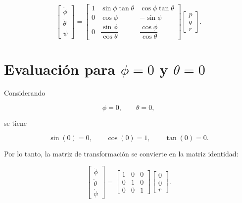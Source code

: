 \documentclass[11pt,a4paper]{article}
\begin{document}
\begin{equation}
\begin{bmatrix}
\dot{\phi}\\
\dot{\theta}\\
\dot{\psi}
\end{bmatrix}
=
\begin{bmatrix}
1 &
\sin\phi\tan\theta &
\cos\phi\tan\theta
\\[2mm]
0 &
\cos\phi &
-\sin\phi
\\[2mm]
0 &
\dfrac{\sin\phi}{\cos\theta} &
\dfrac{\cos\phi}{\cos\theta}
\end{bmatrix}
\begin{bmatrix}
p\\
q\\
r
\end{bmatrix}.
\end{equation}


\section*{Evaluación para $\phi=0$ y $\theta=0$}

Considerando

\begin{equation}
\phi=0,
\qquad
\theta=0,
\end{equation}

se tiene

\begin{equation}
\sin(0)=0,
\qquad
\cos(0)=1,
\qquad
\tan(0)=0.
\end{equation}

Por lo tanto, la matriz de transformación se convierte en la matriz
identidad:

\begin{equation}
\begin{bmatrix}
\dot{\phi}\\
\dot{\theta}\\
\dot{\psi}
\end{bmatrix}
=
\begin{bmatrix}
1&0&0\\
0&1&0\\
0&0&1
\end{bmatrix}
\begin{bmatrix}
0\\
0\\
r
\end{bmatrix}.
\end{equation}
\end{document}
